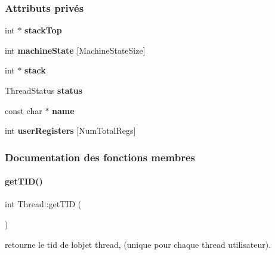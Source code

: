 \subsubsection*{Attributs privés}
\begin{DoxyCompactItemize}
\item 
\hypertarget{class_thread_ac39ffcd6f50a21e542302c408aa70ec0}{}\label{class_thread_ac39ffcd6f50a21e542302c408aa70ec0} 
int $\ast$ {\bfseries stack\+Top}
\item 
\hypertarget{class_thread_ae7f0e9d72338fd2fd49abb20649814fb}{}\label{class_thread_ae7f0e9d72338fd2fd49abb20649814fb} 
int {\bfseries machine\+State} \mbox{[}Machine\+State\+Size\mbox{]}
\item 
\hypertarget{class_thread_a52b4f44d9bf19cd860910044a43d6d5c}{}\label{class_thread_a52b4f44d9bf19cd860910044a43d6d5c} 
int $\ast$ {\bfseries stack}
\item 
\hypertarget{class_thread_a3855378e2bbc5f325c759c87d4b6b068}{}\label{class_thread_a3855378e2bbc5f325c759c87d4b6b068} 
Thread\+Status {\bfseries status}
\item 
\hypertarget{class_thread_adf8367c62ce6a746d82304600cbd2f9c}{}\label{class_thread_adf8367c62ce6a746d82304600cbd2f9c} 
const char $\ast$ {\bfseries name}
\item 
\hypertarget{class_thread_a0206dd43ff9fe866a84bda01f9cbe8be}{}\label{class_thread_a0206dd43ff9fe866a84bda01f9cbe8be} 
int {\bfseries user\+Registers} \mbox{[}Num\+Total\+Regs\mbox{]}
\end{DoxyCompactItemize}


\subsubsection{Documentation des fonctions membres}
\hypertarget{class_thread_a4cb215377b6846f0e9a33084d3d61b68}{}\label{class_thread_a4cb215377b6846f0e9a33084d3d61b68} 
\paragraph{\texorpdfstring{get\+T\+I\+D()}{getTID()}}
{\footnotesize\ttfamily int Thread\+::get\+T\+ID (\begin{DoxyParamCaption}{ }\end{DoxyParamCaption})}



retourne le tid de l\textquotesingle{}objet thread, (unique pour chaque thread utilisateur). 


